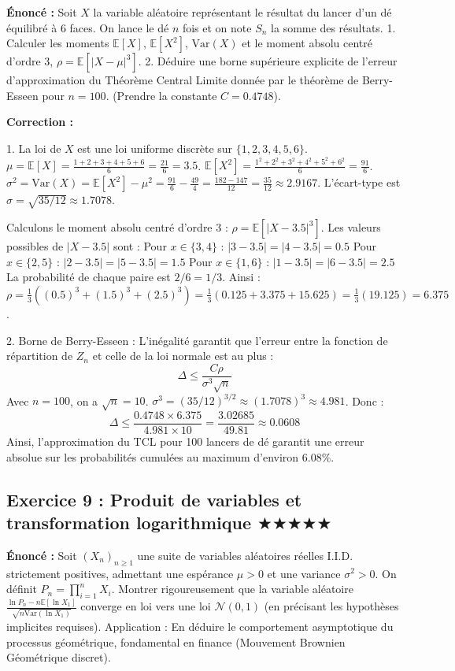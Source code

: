 \documentclass[11pt,a4paper]{article}
\begin{document}
\textbf{Énoncé :}
Soit $X$ la variable aléatoire représentant le résultat du lancer d'un dé équilibré à 6 faces. On lance le dé $n$ fois et on note $S_n$ la somme des résultats.
1. Calculer les moments $\mathbb{E}[X]$, $\mathbb{E}[X^2]$, $\text{Var}(X)$ et le moment absolu centré d'ordre 3, $\rho = \mathbb{E}[|X - \mu|^3]$.
2. Déduire une borne supérieure explicite de l'erreur d'approximation du Théorème Central Limite donnée par le théorème de Berry-Esseen pour $n=100$. (Prendre la constante $C=0.4748$).

\textbf{Correction :}

1. La loi de $X$ est une loi uniforme discrète sur $\{1, 2, 3, 4, 5, 6\}$.
$\mu = \mathbb{E}[X] = \frac{1+2+3+4+5+6}{6} = \frac{21}{6} = 3.5$.
$\mathbb{E}[X^2] = \frac{1^2+2^2+3^2+4^2+5^2+6^2}{6} = \frac{91}{6}$.
$\sigma^2 = \text{Var}(X) = \mathbb{E}[X^2] - \mu^2 = \frac{91}{6} - \frac{49}{4} = \frac{182 - 147}{12} = \frac{35}{12} \approx 2.9167$.
L'écart-type est $\sigma = \sqrt{35/12} \approx 1.7078$.

Calculons le moment absolu centré d'ordre 3 : $\rho = \mathbb{E}[|X - 3.5|^3]$.
Les valeurs possibles de $|X - 3.5|$ sont :
\textbullet{} Pour $x \in \{3, 4\}$ : $|3 - 3.5| = |4 - 3.5| = 0.5$
\textbullet{} Pour $x \in \{2, 5\}$ : $|2 - 3.5| = |5 - 3.5| = 1.5$
\textbullet{} Pour $x \in \{1, 6\}$ : $|1 - 3.5| = |6 - 3.5| = 2.5$
La probabilité de chaque paire est $2/6 = 1/3$.
Ainsi :
$\rho = \frac{1}{3} \left( (0.5)^3 + (1.5)^3 + (2.5)^3 \right) = \frac{1}{3} \left( 0.125 + 3.375 + 15.625 \right) = \frac{1}{3} (19.125) = 6.375$.

2. Borne de Berry-Esseen :
L'inégalité garantit que l'erreur entre la fonction de répartition de $Z_n$ et celle de la loi normale est au plus :
$$\Delta \le \frac{C \rho}{\sigma^3 \sqrt{n}}$$
Avec $n=100$, on a $\sqrt{n} = 10$.
$\sigma^3 = (35/12)^{3/2} \approx (1.7078)^3 \approx 4.981$.
Donc :
$$\Delta \le \frac{0.4748 \times 6.375}{4.981 \times 10} = \frac{3.02685}{49.81} \approx 0.0608$$
Ainsi, l'approximation du TCL pour 100 lancers de dé garantit une erreur absolue sur les probabilités cumulées au maximum d'environ $6.08\%$.


\vspace{1cm}
\subsection*{Exercice 9 : Produit de variables et transformation logarithmique \quad $\bigstar\bigstar\bigstar\bigstar\bigstar$}

\textbf{Énoncé :}
Soit $(X_n)_{n \ge 1}$ une suite de variables aléatoires réelles I.I.D. strictement positives, admettant une espérance $\mu > 0$ et une variance $\sigma^2 > 0$. On définit $P_n = \prod_{i=1}^n X_i$.
Montrer rigoureusement que la variable aléatoire $\frac{\ln P_n - n \mathbb{E}[\ln X_1]}{\sqrt{n \text{Var}(\ln X_1)}}$ converge en loi vers une loi $\mathcal{N}(0, 1)$ (en précisant les hypothèses implicites requises).
Application : En déduire le comportement asymptotique du processus géométrique, fondamental en finance (Mouvement Brownien Géométrique discret).
\end{document}
